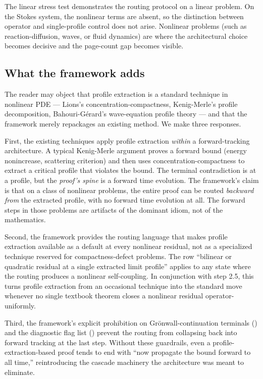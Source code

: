 \documentclass[11pt]{article}
\theoremstyle{plain}
\theoremstyle{definition}
\theoremstyle{remark}
\begin{document}
The  linear stress test demonstrates the routing
protocol on a linear problem. On the Stokes system, the nonlinear terms are
absent, so the distinction between operator and single-profile control does not
arise. Nonlinear problems (such as reaction-diffusion, waves, or fluid dynamics)
are where the architectural choice becomes decisive and the page-count gap
becomes visible.

\subsection{What the framework adds}
\label{subsec:framework-adds}

The reader may object that profile extraction is a standard technique in
nonlinear PDE — Lions's concentration-compactness, Kenig-Merle's profile
decomposition, Bahouri-Gérard's wave-equation profile theory — and that the
framework merely repackages an existing method. We make three responses.

First, the existing techniques apply profile extraction \textit{within} a
forward-tracking architecture. A typical Kenig-Merle argument proves a forward
bound (energy nonincrease, scattering criterion) and then uses
concentration-compactness to extract a critical profile that violates the
bound. The terminal contradiction is at a profile, but the \textit{proof's
spine} is a forward time evolution. The framework's claim is that on a class of
nonlinear problems, the entire proof can be routed \textit{backward from} the
extracted profile, with no forward time evolution at all. The forward steps in
those problems are artifacts of the dominant idiom, not of the mathematics.

Second, the framework provides the routing language that makes profile
extraction available as a default at every nonlinear residual, not as a
specialized technique reserved for compactness-defect problems. The
 row ``bilinear or quadratic residual
at a single extracted limit profile'' applies to any state where the routing
produces a nonlinear self-coupling. In conjunction with
 step 2.5, this turns profile extraction from
an occasional technique into the standard move whenever no single textbook
theorem closes a nonlinear residual operator-uniformly.

Third, the framework's explicit prohibition on Grönwall-continuation terminals
() and the diagnostic flag list
() prevent the routing from collapsing back into
forward tracking at the last step. Without these guardrails, even a
profile-extraction-based proof tends to end with ``now propagate the bound
forward to all time,'' reintroducing the cascade machinery the architecture was
meant to eliminate.
\end{document}

